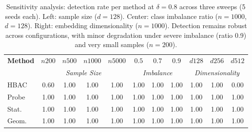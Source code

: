 \begin{table}[ht]
\centering
\scriptsize
\caption{Sensitivity analysis: detection rate per method at $\delta{=}0.8$ across three sweeps (5 seeds each). Left: sample size ($d{=}128$). Center: class imbalance ratio ($n{=}1000$, $d{=}128$). Right: embedding dimensionality ($n{=}1000$). Detection remains robust across configurations, with minor degradation under severe imbalance (ratio 0.9) and very small samples ($n{=}200$).}
\label{tab:sensitivity}
\begin{tabular}{l|cccc|ccc|ccc}
\hline
\textbf{Method} & $n{200}$ & $n{500}$ & $n{1000}$ & $n{5000}$ & $0.5$ & $0.7$ & $0.9$ & $d{128}$ & $d{256}$ & $d{512}$ \\
 & \multicolumn{4}{c|}{\textit{Sample Size}} & \multicolumn{3}{c|}{\textit{Imbalance}} & \multicolumn{3}{c}{\textit{Dimensionality}} \\
\hline
HBAC & 0.60 & 1.00 & 1.00 & 1.00 & 1.00 & 1.00 & 1.00 & 1.00 & 1.00 & 0.00 \\
Probe & 1.00 & 1.00 & 1.00 & 1.00 & 1.00 & 1.00 & 1.00 & 1.00 & 1.00 & 1.00 \\
Stat. & 1.00 & 1.00 & 1.00 & 1.00 & 1.00 & 1.00 & 1.00 & 1.00 & 1.00 & 1.00 \\
Geom. & 1.00 & 1.00 & 1.00 & 1.00 & 1.00 & 1.00 & 1.00 & 1.00 & 1.00 & 1.00 \\
\hline
\end{tabular}
\end{table}